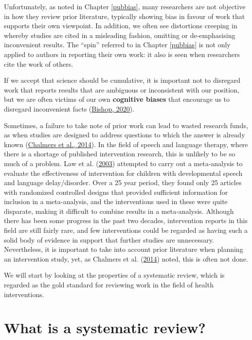 \documentclass{krantz}
\begin{document}
Unfortunately, as noted in Chapter \ref{pubbias}, many researchers are not objective in how they review prior literature, typically showing bias in favour of work that supports their own viewpoint. In addition, we often see distortions creeping in whereby studies are cited in a misleading fashion, omitting or de-emphasising inconvenient results. The ``spin'' referred to in Chapter \ref{pubbias} is not only applied to authors in reporting their own work: it also is seen when researchers cite the work of others.

If we accept that science should be cumulative, it is important not to disregard work that reports results that are ambiguous or inconsistent with our position, but we are often victims of our own \textbf{cognitive biases} that encourage us to disregard inconvenient facts (\protect\hyperlink{ref-bishop2020}{Bishop, 2020}).

Sometimes, a failure to take note of prior work can lead to wasted research funds, as when studies are designed to address questions to which the answer is already known (\protect\hyperlink{ref-chalmers2014}{Chalmers et al., 2014}). In the field of speech and language therapy, where there is a shortage of published intervention research, this is unlikely to be so much of a problem. Law et al. (\protect\hyperlink{ref-law2003}{2003}) attempted to carry out a meta-analysis to evaluate the effectiveness of intervention for children with developmental speech and language delay/disorder. Over a 25 year period, they found only 25 articles with randomized controlled designs that provided sufficient information for inclusion in a meta-analysis, and the interventions used in these were quite disparate, making it difficult to combine results in a meta-analysis. Although there has been some progress in the past two decades, intervention reports in this field are still fairly rare, and few interventions could be regarded as having such a solid body of evidence in support that further studies are unnecessary. Nevertheless, it is important to take into account prior literature when planning an intervention study, yet, as Chalmers et al. (\protect\hyperlink{ref-chalmers2014}{2014}) noted, this is often not done.

We will start by looking at the properties of a systematic review, which is regarded as the gold standard for reviewing work in the field of health interventions.

\hypertarget{what-is-a-systematic-review}{%
\section{What is a systematic review?}\label{what-is-a-systematic-review}}
\end{document}
